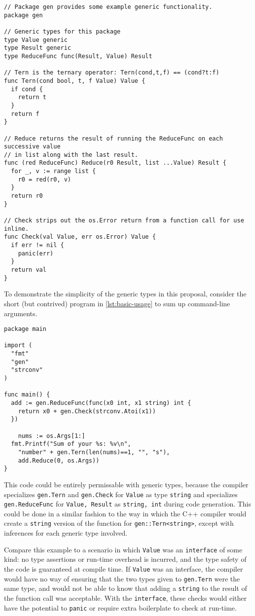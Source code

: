 \documentclass[10pt,a4paper]{article}
\newcommand{\code}[1]{\texttt{#1}}
\newcommand{\Listing}[1]{\autoref{lst:#1}}
\begin{document}
\begin{lstlisting}[float=tbp,caption={Basic example of generic types},label=lst:basic]
// Package gen provides some example generic functionality.
package gen

// Generic types for this package
type Value generic
type Result generic
type ReduceFunc func(Result, Value) Result

// Tern is the ternary operator: Tern(cond,t,f) == (cond?t:f)
func Tern(cond bool, t, f Value) Value {
  if cond {
    return t
  }
  return f
}

// Reduce returns the result of running the ReduceFunc on each successive value
// in list along with the last result.
func (red ReduceFunc) Reduce(r0 Result, list ...Value) Result {
  for _, v := range list {
    r0 = red(r0, v)
  }
  return r0
}

// Check strips out the os.Error return from a function call for use inline.
func Check(val Value, err os.Error) Value {
  if err != nil {
    panic(err)
  }
  return val
}
\end{lstlisting}

To demonstrate the simplicity of the generic types in this proposal, consider the short (but contrived) program in \Listing{basic-usage} to sum up command-line arguments.

\begin{lstlisting}[float=htbp,caption={Usage of basic generic types},label=lst:basic-usage]
package main

import (
  "fmt"
  "gen"
  "strconv"
)

func main() {
  add := gen.ReduceFunc(func(x0 int, x1 string) int {
    return x0 + gen.Check(strconv.Atoi(x1))
  })

	nums := os.Args[1:]
  fmt.Printf("Sum of your %s: %v\n",
    "number" + gen.Tern(len(nums)==1, "", "s"),
    add.Reduce(0, os.Args))
}
\end{lstlisting}

This code could be entirely permissable with generic types, because the compiler specializes \code{gen.Tern} and \code{gen.Check} for \code{Value} as type \code{string} and specializes \code{gen.ReduceFunc} for \code{Value, Result} as \code{string, int} during code generation.  This could be done in a similar fashion to the way in which the C++ compiler would create a \code{string} version of the function for \code{gen::Tern<string>}, except with inferences for each generic type involved.

Compare this example to a scenario in which \code{Value} was an \code{interface} of some kind:  no type assertions or run-time overhead is incurred, and the type safety of the code is guaranteed at compile time.  If \code{Value} was an interface, the compiler would have no way of ensuring that the two types given to \code{gen.Tern} were the same type, and would not be able to know that adding a \code{string} to the result of the function call was acceptable. With the \code{interface}, these checks would either have the potential to \code{panic} or require extra boilerplate to check at run-time.
\end{document}
